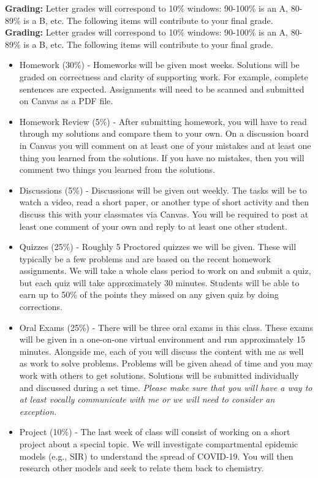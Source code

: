 \documentclass[12pt]{amsbook}
\begin{document}
\textbf{Grading:} Letter grades will correspond to 10\% windows: 90-100\% is an A, 80-89\% is a B, etc. The following items will contribute to your final grade.
\textbf{Grading:} Letter grades will correspond to 10\% windows: 90-100\% is an A, 80-89\% is a B, etc. The following items will contribute to your final grade.
\begin{itemize}
\item Homework (30\%) - Homeworks will be given most weeks. Solutions will be graded on correctness and clarity of supporting work. For example, complete sentences are expected. Assignments will need to be scanned and submitted on Canvas as a PDF file.
\item Homework Review (5\%) - After submitting homework, you will have to read through my solutions and compare them to your own. On a discussion board in Canvas you will comment on at least one of your mistakes and at least one thing you learned from the solutions. If you have no mistakes, then you will comment two things you learned from the solutions.
\item Discussions (5\%) - Discussions will be given out weekly. The tasks will be to watch a video, read a short paper, or another type of short activity and then discuss this with your classmates via Canvas. You will be required to post at least one comment of your own and reply to at least one other student.
\item Quizzes (25\%) -  Roughly 5 Proctored quizzes we will be given.  These will typically be a few problems and are based on the recent homework assignments. We will take a whole class period to work on and submit a quiz, but each quiz will take approximately 30 minutes. Students will be able to earn up to 50\% of the points they missed on any given quiz by doing corrections.
\item Oral Exams (25\%) - There will be three oral exams in this class. These exams will be given in a one-on-one virtual environment and run approximately 15 minutes.  Alongside me, each of you will discuss the content with me as well as work to solve problems. Problems will be given ahead of time and you may work with others to get solutions.  Solutions will be submitted individually and discussed during a set time. \emph{Please make sure that you will have a way to at least vocally communicate with me or we will need to consider an exception.}
\item Project (10\%) - The last week of class will consist of working on a short project about a special topic.  We will investigate compartmental epidemic models (e.g., SIR) to understand the spread of COVID-19.  You will then research other models and seek to relate them back to chemistry. 
\end{itemize}
\end{document}
